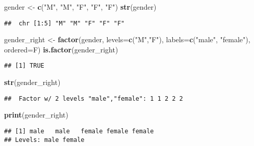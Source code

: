 \documentclass[
]{article}
\newenvironment{Shaded}{\begin{snugshade}}{\end{snugshade}}
\newcommand{\AttributeTok}[1]{\textcolor[rgb]{0.13,0.29,0.53}{#1}}
\newcommand{\FunctionTok}[1]{\textcolor[rgb]{0.13,0.29,0.53}{\textbf{#1}}}
\newcommand{\NormalTok}[1]{#1}
\newcommand{\OtherTok}[1]{\textcolor[rgb]{0.56,0.35,0.01}{#1}}
\newcommand{\StringTok}[1]{\textcolor[rgb]{0.31,0.60,0.02}{#1}}
\begin{document}
\begin{Shaded}
\begin{Highlighting}[]
\NormalTok{gender }\OtherTok{\textless{}{-}} \FunctionTok{c}\NormalTok{(}\StringTok{"M"}\NormalTok{, }\StringTok{"M"}\NormalTok{, }\StringTok{"F"}\NormalTok{, }\StringTok{"F"}\NormalTok{, }\StringTok{"F"}\NormalTok{)}
\FunctionTok{str}\NormalTok{(gender)}
\end{Highlighting}
\end{Shaded}

\begin{verbatim}
##  chr [1:5] "M" "M" "F" "F" "F"
\end{verbatim}

\begin{Shaded}
\begin{Highlighting}[]
\NormalTok{gender\_right }\OtherTok{\textless{}{-}} \FunctionTok{factor}\NormalTok{(gender, }\AttributeTok{levels=}\FunctionTok{c}\NormalTok{(}\StringTok{"M"}\NormalTok{,}\StringTok{"F"}\NormalTok{),}
                       \AttributeTok{labels=}\FunctionTok{c}\NormalTok{(}\StringTok{"male"}\NormalTok{, }\StringTok{"female"}\NormalTok{), }\AttributeTok{ordered=}\NormalTok{F)}
\FunctionTok{is.factor}\NormalTok{(gender\_right)}
\end{Highlighting}
\end{Shaded}

\begin{verbatim}
## [1] TRUE
\end{verbatim}

\begin{Shaded}
\begin{Highlighting}[]
\FunctionTok{str}\NormalTok{(gender\_right)}
\end{Highlighting}
\end{Shaded}

\begin{verbatim}
##  Factor w/ 2 levels "male","female": 1 1 2 2 2
\end{verbatim}

\begin{Shaded}
\begin{Highlighting}[]
\FunctionTok{print}\NormalTok{(gender\_right)}
\end{Highlighting}
\end{Shaded}

\begin{verbatim}
## [1] male   male   female female female
## Levels: male female
\end{verbatim}
\end{document}
